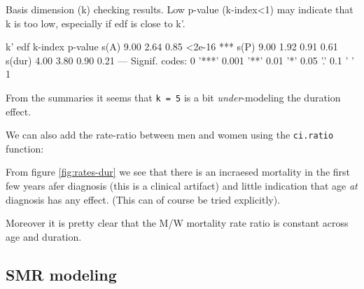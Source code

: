 \begin{enumerate}[resume]
\begin{Schunk}
\begin{Soutput}
Basis dimension (k) checking results. Low p-value (k-index<1) may
indicate that k is too low, especially if edf is close to k'.

         k'  edf k-index p-value    
s(A)   9.00 2.64    0.85  <2e-16 ***
s(P)   9.00 1.92    0.91    0.61    
s(dur) 4.00 3.80    0.90    0.21    
---
Signif. codes:  0 '***' 0.001 '**' 0.01 '*' 0.05 '.' 0.1 ' ' 1
\end{Soutput}
\end{Schunk}
From the summaries it seems that \texttt{k = 5} is a bit \emph{under}-modeling the
duration effect.

We can also add the rate-ratio between men and women using the
\texttt{ci.ratio} function:
\begin{Schunk}
\end{Schunk}
From figure \ref{fig:rates-dur} we see that there is an incraesed
mortality in the first few years afer diagnosis (this is a clinical
artifact) and little indication that age \emph{at} diagnosis has any effect.
(This can of course be tried explicitly).

Moreover it is pretty clear that the M/W mortality rate ratio is
constant across age and duration.

\end{enumerate}

\subsection{SMR modeling}

